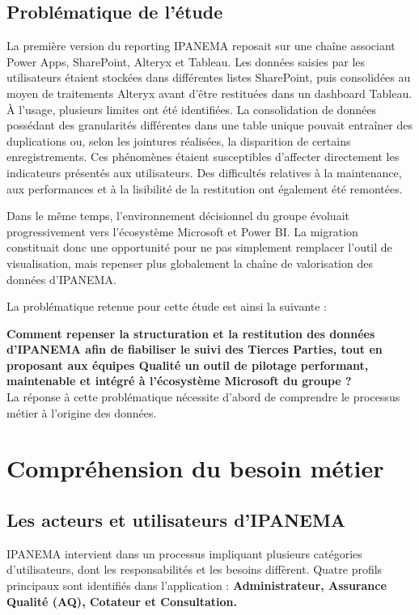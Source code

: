 \subsection{Problématique de l’étude}
La première version du reporting IPANEMA reposait sur une chaîne associant Power Apps, SharePoint, Alteryx et Tableau. Les données saisies par les utilisateurs étaient stockées dans différentes listes SharePoint, puis consolidées au moyen de traitements Alteryx avant 
d’être restituées dans un dashboard Tableau. À l’usage, plusieurs limites ont été identifiées. La consolidation de données possédant 
des granularités différentes dans une table unique pouvait entraîner des duplications ou, selon 
les jointures réalisées, la disparition de certains enregistrements. Ces phénomènes étaient 
susceptibles d’affecter directement les indicateurs présentés aux utilisateurs. Des difficultés 
relatives à la maintenance, aux performances et à la lisibilité de la restitution ont également 
été remontées. 

Dans le même temps, l’environnement décisionnel du groupe évoluait progressivement 
vers l’écosystème Microsoft et Power BI. La migration constituait donc une opportunité pour 
ne pas simplement remplacer l’outil de visualisation, mais repenser plus globalement la chaîne 
de valorisation des données d’IPANEMA.

La problématique retenue pour cette étude est ainsi la suivante :

\textbf{Comment repenser la structuration et la restitution des données d’IPANEMA afin de fiabiliser le suivi des Tierces Parties, tout en proposant aux équipes Qualité un outil de pilotage performant, maintenable et intégré à l’écosystème Microsoft du groupe ?}
\\
La réponse à cette problématique nécessite d’abord de comprendre le processus métier 
à l’origine des données.

\section{Compréhension du besoin métier}

\subsection{Les acteurs et utilisateurs d’IPANEMA}

IPANEMA intervient dans un processus impliquant plusieurs catégories d’utilisateurs, 
dont les responsabilités et les besoins diffèrent. Quatre profils principaux sont identifiés dans 
l’application : \textbf{ Administrateur, Assurance Qualité (AQ), Cotateur et Consultation.}

